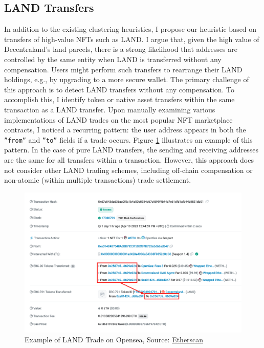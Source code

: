 \documentclass[12pt,a4paper,titlepage,oneside,english]{article}
\begin{document}
\subsection{LAND Transfers}
In addition to the existing clustering heuristics, I propose our heuristic based on transfers of high-value NFTs such as LAND. I argue that, given the high value of Decentraland's land parcels, there is a strong likelihood that addresses are controlled by the same entity when LAND is transferred without any compensation. Users might perform such transfers to rearrange their LAND holdings, e.g., by upgrading to a more secure wallet. \newline
The primary challenge of this approach is to detect LAND transfers without any compensation. To accomplish this, I identify token or native asset transfers within the same transaction as a LAND transfer. Upon manually examining various implementations of LAND trades on the most popular NFT marketplace contracts, I noticed a recurring pattern: the user address appears in both the \texttt{''from''} and \texttt{''to''} fields if a trade occurs. Figure \ref{fig:LAND_example} illustrates an example of this pattern. 
In the case of pure LAND transfers, the sending and receiving addresses are the same for all transfers within a transaction. However, this approach does not consider other LAND trading schemes, including off-chain compensation or non-atomic (within multiple transactions) trade settlement.

\begin{figure}[h!]
	\centering
	\includegraphics[width=\textwidth]{./figures/etherscan-opensea.png}
	\caption{Example of LAND Trade on Opensea, Source: \href{https://etherscan.io/tx/0x2c2a70114e9080596bf5da6ad9c9b9f6d7e4c85a9d3b06e992f7248f9457a2ec}{Etherscan}}
	\label{fig:LAND_example}
\end{figure}
\end{document}
